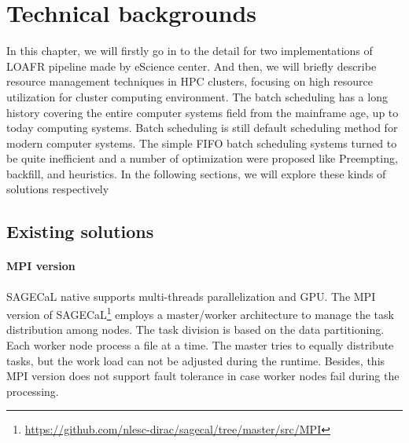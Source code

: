 
\chapter{Technical backgrounds} %



\ifpdf
    \graphicspath{{2_literaturereview/figures/PNG/}{2_literaturereview/figures/PDF/}{2_literaturereview/figures/}}
\else
    \graphicspath{{2_literaturereview/figures/EPS/}{2_literaturereview/figures/}}
\fi


% 
In this chapter, we will firstly go in to the detail for two implementations of LOAFR pipeline made by eScience center.
And then, we will briefly describe resource management techniques in HPC clusters, focusing on high resource utilization for cluster computing environment.
The batch scheduling has a long history covering the entire computer systems field from the mainframe age, up to today computing systems. Batch scheduling is still default scheduling method for modern computer systems. 
The simple FIFO batch scheduling systems turned to be quite inefficient  and a number of optimization were proposed like Preempting, backfill, and heuristics.
In the following sections, we will explore these kinds of solutions respectively 
\section{Existing solutions}
\subsubsection*{MPI version}
SAGECaL native supports multi-threads parallelization and GPU. The MPI version of SAGECaL\footnote{\url{https://github.com/nlesc-dirac/sagecal/tree/master/src/MPI}} employs a master/worker architecture to manage the task distribution among nodes.
The task division is based on the data partitioning. Each worker node process a file at a time. 
The master tries to equally distribute tasks, but the work load can not be adjusted during the runtime.
Besides, this MPI version does not support fault tolerance in case worker nodes fail during the processing.
